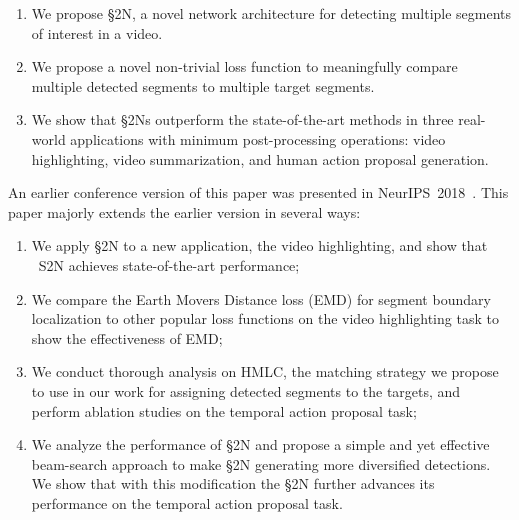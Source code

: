 \documentclass[10pt,journal,compsoc]{IEEEtran}
\begin{document}
\begin{enumerate}
	\item We propose \S2N, a novel network architecture for detecting multiple segments of interest in a video.
	\item We propose a novel non-trivial loss function to meaningfully compare  multiple detected segments to multiple target segments.
	\item We show that \S2Ns outperform the state-of-the-art methods in three real-world applications with minimum post-processing operations: video highlighting, video summarization, and human action proposal generation.
\end{enumerate}
An earlier conference version of this paper was presented in NeurIPS~2018~\cite{m_Wei-etal-NIPS18}. This paper majorly extends the earlier version in several ways:


\begin{enumerate}
    \item We apply \S2N to a new application, the video highlighting, and show that \
S2N achieves state-of-the-art performance;
    \item We compare the Earth Movers Distance loss (EMD) for segment boundary localization to other popular loss functions on the video highlighting task to show the effectiveness of EMD;
    \item We conduct thorough analysis on HMLC, the matching strategy we propose to use in our work for assigning detected segments to the targets, and perform ablation studies on the temporal action proposal task;
    \item We analyze the performance of \S2N and propose a simple and yet effective beam-search approach to make \S2N generating more diversified detections. We show that with this modification the \S2N further advances its performance on the temporal action proposal task.
\end{enumerate}
\end{document}

